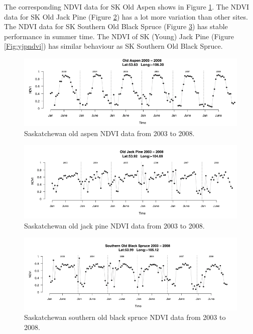 \documentclass{article}
\begin{document}
The corresponding NDVI data for SK Old Aspen shows in Figure \ref{Fig:oapndvi}. The NDVI data for SK Old Jack Pine (Figure \ref{Fig:ojpndvi}) has a lot more variation than other sites. The NDVI data for SK Southern Old Black Spruce (Figure \ref{Fig:soundvi}) has stable performance in summer time. The NDVI of SK (Young) Jack Pine (Figure \ref{Fig:yjpndvi}) has similar behaviour as SK  Southern Old Black Spruce.

\begin{figure}[!ht]
\centering
\includegraphics[width=14cm]{oapndvi.png}
\caption{Saskatchewan old aspen NDVI data from 2003 to 2008.}
\label{Fig:oapndvi}
\end{figure}

\begin{figure}[!ht]
\centering
\includegraphics[width=14cm]{ojpndvi.png}
\caption{Saskatchewan old jack pine NDVI data from 2003 to 2008.}
\label{Fig:ojpndvi}
\end{figure}

\begin{figure}[!ht]
\centering
\includegraphics[width=14cm]{soundvi.png}
\caption{Saskatchewan southern old black spruce NDVI data from 2003 to 2008.}
\label{Fig:soundvi}
\end{figure}
\end{document}
